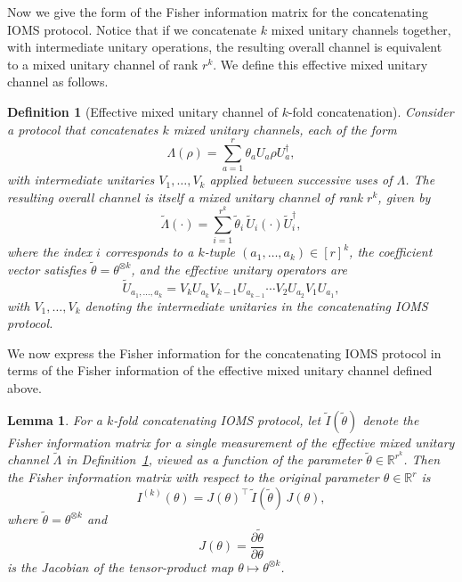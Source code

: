 \documentclass[12pt]{article}
\newtheorem{lemma}{Lemma}
\newtheorem{definition}{Definition}
\begin{document}
Now we give the form of the Fisher information matrix for the concatenating IOMS protocol. Notice that if we concatenate $k$ mixed unitary channels together, with intermediate unitary operations, the resulting overall channel is equivalent to a mixed unitary channel of rank $r^k$. We define this effective mixed unitary channel as follows.

\begin{definition}[Effective mixed unitary channel of $k$-fold concatenation]\label{def:effectk}
Consider a protocol that concatenates $k$ mixed unitary channels, each of the form
\begin{equation}
    \Lambda(\rho) = \sum_{a=1}^r \theta_a U_a \rho U_a^\dagger,
\end{equation}
with intermediate unitaries $V_1,\dots,V_k$ applied between successive uses of $\Lambda$.
The resulting overall channel is itself a mixed unitary channel of rank $r^k$, given by
\begin{equation}
    \tilde{\Lambda}(\cdot)
    = \sum_{i=1}^{r^k} \tilde{\theta}_i\, \tilde{U}_i (\cdot) \tilde{U}_i^\dagger,
\end{equation}
where the index $i$ corresponds to a $k$-tuple $(a_1,\dots,a_k) \in [r]^k$, 
the coefficient vector satisfies $\tilde{\theta} = \theta^{\otimes k}$, and the effective unitary operators are
\begin{equation}
    \tilde{U}_{a_1,\dots,a_k}
    = V_k U_{a_k} V_{k-1} U_{a_{k-1}} \cdots V_2 U_{a_2} V_1 U_{a_1},
\end{equation}
with $V_1,\dots,V_k$ denoting the intermediate unitaries in the concatenating IOMS protocol.
\end{definition}

We now express the Fisher information for the concatenating IOMS protocol in terms of the Fisher information of the effective mixed unitary channel defined above.

\begin{lemma}\label{lm:FI-k-concat}
For a $k$-fold concatenating IOMS protocol, let $\tilde{I}(\tilde{\theta})$ denote the Fisher information matrix for a single measurement of the effective mixed unitary channel $\tilde{\Lambda}$ in Definition~\ref{def:effectk}, viewed as a function of the parameter $\tilde{\theta} \in \mathbb{R}^{r^k}$. Then the Fisher information matrix with respect to the original parameter $\theta \in \mathbb{R}^r$ is
\begin{equation}\label{eq:concFI}
    I^{(k)}(\theta)
    = J(\theta)^{\top} \, \tilde{I}(\tilde{\theta}) \, J(\theta),
\end{equation}
where $\tilde{\theta} = \theta^{\otimes k}$ and
\begin{equation}
    J(\theta) = \frac{\partial \tilde{\theta}}{\partial \theta}
\end{equation}
is the Jacobian of the tensor-product map $\theta \mapsto \theta^{\otimes k}$.
\end{lemma}
\end{document}
